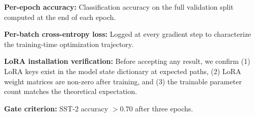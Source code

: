 \textbf{Per-epoch accuracy:} Classification accuracy on the full validation split computed at the end of each epoch.

\textbf{Per-batch cross-entropy loss:} Logged at every gradient step to characterize the training-time optimization trajectory.

\textbf{LoRA installation verification:} Before accepting any result, we confirm (1) LoRA keys exist in the model state dictionary at expected paths, (2) LoRA weight matrices are non-zero after training, and (3) the trainable parameter count matches the theoretical expectation.

\textbf{Gate criterion:} SST-2 accuracy $> 0.70$ after three epochs.
